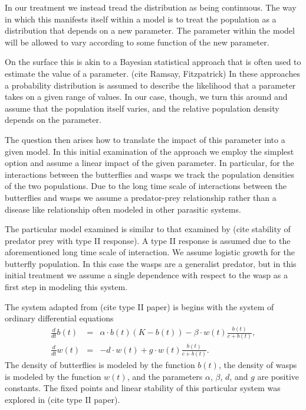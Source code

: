 \documentclass[12pt]{article}
\begin{document}
In our treatment we instead tread the distribution as being
continuous. The way in which this manifests itself within a model is
to treat the population as a distribution that depends on a new
parameter. The parameter within the model will be allowed to vary
according to some function of the new parameter.

On the surface this is akin to a Bayesian statistical approach that is
often used to estimate the value of a parameter. (cite Ramsay,
Fitzpatrick) In these approaches a probability distribution is assumed
to describe the likelihood that a parameter takes on a given range of
values. In our case, though, we turn this around and assume that the
population itself varies, and the relative population density depends
on the parameter.

The question then arises how to translate the impact of this parameter
into a given model. In this initial examination of the approach we
employ the simplest option and assume a linear impact of the given
parameter. In particular, for the interactions between the butterflies
and wasps we track the population densities of the two
populations. Due to the long time scale of interactions between the
butterflies and wasps we assume a predator-prey relationship rather
than a disease like relationship often modeled in other parasitic
systems.

The particular model examined is similar to that examined by (cite
stability of predator prey with type II response). A type II response
is assumed due to the aforementioned long time scale of
interaction. We assume logistic growth for the butterfly
population. In this case the wasps are a generalist predator, but in
this initial treatment we assume a single dependence with respect to
the wasp as a first step in modeling this system.

The system adapted from (cite type II paper) is begins with the system
of ordinary differential equations
\begin{eqnarray}
  \label{eq:initialSystem1}
  \frac{d}{dt} b(t) & = & \alpha \cdot b(t) (K - b(t)) - \beta \cdot w(t) \frac{b(t)}{c+b(t)}, \\
  \label{eq:initialSystem2}
  \frac{d}{dt} w(t) & = & -d \cdot w(t) + g \cdot w(t) \frac{b(t)}{c+b(t)}.
\end{eqnarray}
The density of butterflies is modeled by the function $b(t)$, the
density of wasps is modeled by the function $w(t)$, and the parameters
$\alpha$, $\beta$, $d$, and $g$ are positive constants. The fixed
points and linear stability of this particular system was explored in
(cite type II paper). 
\end{document}
